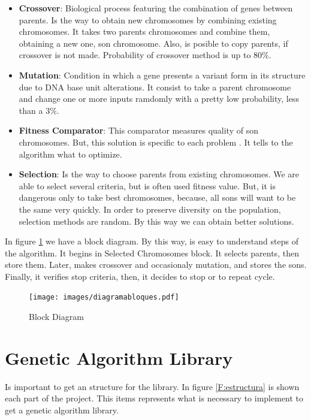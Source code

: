 \documentclass[letterpaper]{article}
\begin{document}
\begin{itemize}
\item \textbf{Crossover}: Biological process featuring the combination of genes between parents. Is the way to obtain new chromosomes  by combining existing chromosomes. It takes two parents chromosomes and combine them, obtaining a new one, son chromosome. Also, is posible to copy parents, if crossover is not made. Probability of crossover method is up to $80\%$.

\item \textbf{Mutation}: Condition in which a gene presents a variant form in its structure due to DNA base unit alterations. It consist to take a parent chromosome and change one or more inputs ramdomly with a pretty low probability, less than a $3\%$.

\item \textbf{Fitness Comparator}: This comparator measures quality of son chromosomes. But, this solution is specific to each problem \cite{code}. It tells to the algorithm what to optimize. 

\item \textbf{Selection}: Is the way to choose parents from existing chromosomes. We are able to select several criteria, but is often used fitness value. But, it is dangerous only to take best chromosomes, because, all sons will want to be the same very quickly. In order to preserve diversity on the population, selection methods are random. By this way we can obtain better solutions. 

\end{itemize}

In figure \ref{F:bloques} we have a block diagram. By this way, is easy to understand steps of the algorithm. It begins in Selected Chromosomes block. It selects parents, then store them. Later, makes crossover and occasionaly mutation, and stores the sons. Finally, it verifies stop criteria, then, it decides to stop or to repeat cycle. 

\begin{figure}
\centering
\texttt{[image: images/diagramabloques.pdf]}
\caption{Block Diagram}
\label{F:bloques}
\end{figure}


\section{Genetic Algorithm Library}

Is important to get an structure for the library. In figure \ref{F:estructura} is shown each part of the project. This items represents what is necessary to implement to get a genetic algorithm library.\\
\end{document}
